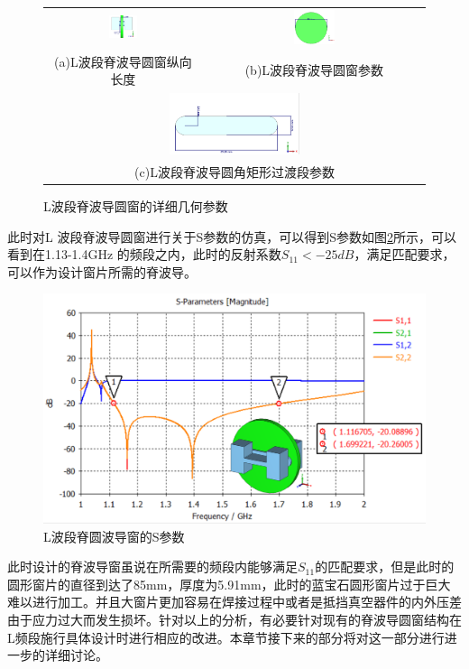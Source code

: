 \documentclass[master]{thesis-uestc}
\begin{document}
\begin{figure}[!htb]
    \small
    \centering
    \begin{tabular}{@{\ }c@{\ }c}
        \includegraphics[width=0.19\textwidth]{pic/chapter4/L波段窗纵向长度ORI.png} & 
        \hspace{5pt}
        \includegraphics[width=0.19\textwidth]{pic/chapter4/L波段圆形窗片.png}     \\
        \mbox{\small (a)L波段脊波导圆窗纵向长度}                                                                               & 
        \mbox{\small (b)L波段脊波导圆窗参数}                                                           \\[6bp]
        \multicolumn{2}{c}{\includegraphics[width=0.35\textwidth]{pic/chapter4/L波段圆角矩形过渡段ORI.png}} \\  %
        \multicolumn{2}{c}{\mbox{\small (c)L波段脊波导圆角矩形过渡段参数}}             
    \end{tabular}
    \caption{L波段脊波导圆窗的详细几何参数}
    \label{fig:L波段脊波导圆窗的详细几何参数}
\end{figure}

此时对L 波段脊波导圆窗进行关于S参数的仿真，可以得到S参数如图\ref{fig:L波段脊圆波导窗的S参数}所示，可以看到在1.13-1.4GHz 的频段之内，此时的反射系数$S_{11}<-25dB$，满足匹配要求，可以作为设计窗片所需的脊波导。
\begin{figure}[!htb]
    \centering
    \includegraphics[width=0.45\linewidth]{pic/chapter4/L波段脊圆波导窗的S参数.png}
    \caption{L波段脊圆波导窗的S参数}
    \label{fig:L波段脊圆波导窗的S参数}
\end{figure}
此时设计的脊波导窗虽说在所需要的频段内能够满足$S_{11}$的匹配要求，但是此时的圆形窗片的直径到达了85mm，厚度为5.91mm，此时的蓝宝石圆形窗片过于巨大难以进行加工。并且大窗片更加容易在焊接过程中或者是抵挡真空器件的内外压差由于应力过大而发生损坏。针对以上的分析，有必要针对现有的脊波导圆窗结构在L频段施行具体设计时进行相应的改进。本章节接下来的部分将对这一部分进行进一步的详细讨论。
\end{document}
